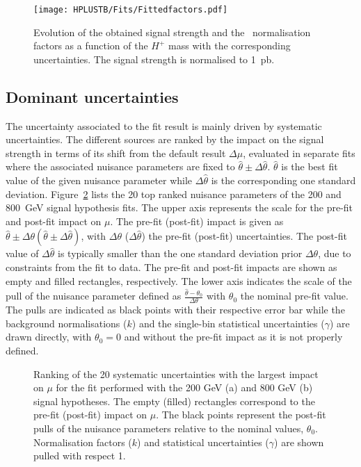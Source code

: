 \begin{figure}[htb]
    \RawFloats
    \centering
    \texttt{[image: HPLUSTB/Fits/Fittedfactors.pdf]}
    \caption{Evolution of the obtained signal strength and the \ttHF\ normalisation factors as
    a function of the $H^+$ mass with the corresponding uncertainties. The signal strength is normalised to 1~pb.   
    }
    \label{Hplustb:fittedfactorsvsmass}
\end{figure}


\subsection{Dominant uncertainties}

The uncertainty associated to the fit result is mainly driven by systematic uncertainties. The different sources are ranked by the impact on the signal strength in terms of its shift from the default result $\Delta\mu$, evaluated in separate fits where the associated nuisance parameters are fixed to $\hat{\theta}\pm\Delta\hat{\theta}$. $\hat{\theta}$ is the best fit value of the given nuisance parameter while $\Delta\hat{\theta}$ is the corresponding one standard deviation. Figure~\ref{Hplustb:ranking200800} lists the 20 top ranked nuisance parameters of the 200 and 800~GeV signal hypothesis fits. The upper axis represents the scale for the pre-fit and post-fit impact on $\mu$. The pre-fit (post-fit) impact is given as $\hat{\theta} \pm \Delta\theta (\hat{\theta} \pm \Delta\hat{\theta})$, with $\Delta\theta$ ($\Delta\hat{\theta}$) the pre-fit (post-fit) uncertainties. The post-fit value of $\Delta\hat{\theta}$ is typically smaller than the one standard deviation prior $\Delta\theta$, due to constraints from the fit to data. The pre-fit and post-fit impacts are shown as empty and filled rectangles, respectively. The lower axis indicates the scale of the pull of the nuisance parameter defined as $\frac{\hat{\theta} -\theta_0}{\Delta\theta}$ with $\theta_0$ the nominal pre-fit value. The pulls are indicated as black points with their respective error bar while the background normalisations ($k$) and the single-bin statistical uncertainties ($\gamma$) are drawn directly, with $\theta_0=0$ and without the pre-fit impact as it is not properly defined.

\begin{figure}[htb]
    \RawFloats
    \centering
    \caption{Ranking of the 20 systematic uncertainties with the largest impact on $\mu$ for the fit performed with the 200 GeV (a) and 800 GeV (b) signal hypotheses. The empty (filled) rectangles correspond
    to the pre-fit (post-fit) impact on $\mu$. The black points represent the post-fit pulls of the nuisance parameters relative to the nominal values, $\theta_0$. Normalisation factors ($k$) and statistical uncertainties ($\gamma$) are shown pulled with respect 1.
    }
    \label{Hplustb:ranking200800}
\end{figure}

